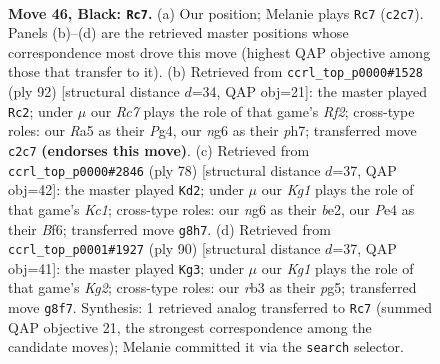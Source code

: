 \documentclass[11pt]{article}
\begin{document}
\clearpage

\begin{figure}[p]\centering
\begin{subfigure}{0.46\textwidth}\centering
\resizebox{\linewidth}{!}{%
\newchessgame
\chessboard[
  setfen={6k1/6p1/1p4N1/r2p4/P3p3/1R6/2r2PK1/3q4 b - - 1 46},
  showmover=false,
  pgfstyle=straightmove, color=movearrow, markmove={c2-c7}
]}
\caption{}
\end{subfigure}\hfill
\begin{subfigure}{0.46\textwidth}\centering
\resizebox{\linewidth}{!}{%
\newchessgame
\chessboard[
  setfen={5k2/5p1p/2p5/8/2p3P1/P3r2P/1P3R2/6K1 w - - 3 47},
  showmover=false,
  pgfstyle=straightmove, color=movearrow, markmove={f2-c2}
]}
\caption{}
\end{subfigure}
\\[4pt]
\begin{subfigure}{0.46\textwidth}\centering
\resizebox{\linewidth}{!}{%
\newchessgame
\chessboard[
  setfen={8/1k6/5B2/1p6/pR6/2P3r1/PP2b3/2K5 w - - 0 40},
  showmover=false,
  pgfstyle=straightmove, color=movearrow, markmove={c1-d2}
]}
\caption{}
\end{subfigure}\hfill
\begin{subfigure}{0.46\textwidth}\centering
\resizebox{\linewidth}{!}{%
\newchessgame
\chessboard[
  setfen={8/7p/8/5kp1/pR6/P6P/1P1r1PK1/8 w - - 8 46},
  showmover=false,
  pgfstyle=straightmove, color=movearrow, markmove={g2-g3}
]}
\caption{}
\end{subfigure}
\caption{\textbf{Move 46, Black: \texttt{Rc7}.} (a) Our position; Melanie plays \texttt{Rc7} (\texttt{c2c7}). Panels (b)--(d) are the retrieved master positions whose correspondence most drove this move (highest QAP objective among those that transfer to it). (b) Retrieved from \texttt{ccrl\_top\_p0000\#1528} (ply 92) [structural distance $d$=34, QAP obj=21]: the master played \texttt{Rc2}; under $\mu$ our \emph{Rc7} plays the role of that game's \emph{Rf2}; cross-type roles: our \emph{R}a5 as their \emph{P}g4, our \emph{n}g6 as their \emph{p}h7; transferred move \texttt{c2c7} \textbf{(endorses this move)}. (c) Retrieved from \texttt{ccrl\_top\_p0000\#2846} (ply 78) [structural distance $d$=37, QAP obj=42]: the master played \texttt{Kd2}; under $\mu$ our \emph{Kg1} plays the role of that game's \emph{Kc1}; cross-type roles: our \emph{n}g6 as their \emph{b}e2, our \emph{P}e4 as their \emph{B}f6; transferred move \texttt{g8h7}. (d) Retrieved from \texttt{ccrl\_top\_p0001\#1927} (ply 90) [structural distance $d$=37, QAP obj=41]: the master played \texttt{Kg3}; under $\mu$ our \emph{Kg1} plays the role of that game's \emph{Kg2}; cross-type roles: our \emph{r}b3 as their \emph{p}g5; transferred move \texttt{g8f7}. Synthesis: 1 retrieved analog transferred to \texttt{Rc7} (summed QAP objective 21, the strongest correspondence among the candidate moves); Melanie committed it via the \texttt{search} selector.}
\label{fig:thought-m91}
\end{figure}
\end{document}
